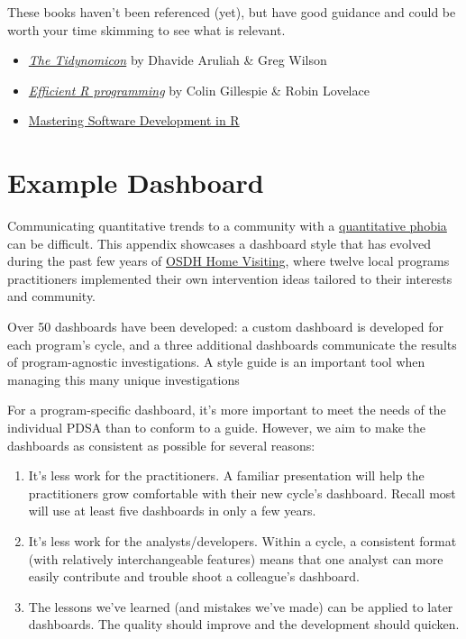 \documentclass[
]{book}
\providecommand{\tightlist}{%
  \setlength{\itemsep}{0pt}\setlength{\parskip}{0pt}}
\begin{document}
These books haven't been referenced (yet), but have good guidance and could be worth your time skimming to see what is relevant.

\begin{itemize}
\item
  \href{http://tidynomicon.tech/}{\emph{The Tidynomicon}} by Dhavide Aruliah \& Greg Wilson
\item
  \href{https://bookdown.org/csgillespie/efficientR/}{\emph{Efficient R programming}} by Colin Gillespie \& Robin Lovelace
\item
  \href{https://bookdown.org/rdpeng/RProgDA/}{Mastering Software Development in R}
\end{itemize}

\hypertarget{example-dashboard}{%
\chapter{Example Dashboard}\label{example-dashboard}}

Communicating quantitative trends to a community with a \protect\hyperlink{publication-phobic}{quantitative phobia} can be difficult. This appendix showcases a dashboard style that has evolved during the past few years of \href{https://www.ok.gov/health/Family_Health/Family_Support_and_Prevention_Service/MIECHV_Program_-_Federal_Home_Visiting_Grant/About_the_MIECHV_Program_-_Federal_Home_Visiting_Grant/index.html}{OSDH Home Visiting}, where twelve local programs practitioners implemented their own intervention ideas tailored to their interests and community.

Over 50 dashboards have been developed: a custom dashboard is developed for each program's cycle, and a three additional dashboards communicate the results of program-agnostic investigations. A style guide is an important tool when managing this many unique investigations

For a program-specific dashboard, it's more important to meet the needs of the individual PDSA than to conform to a guide. However, we aim to make the dashboards as consistent as possible for several reasons:

\begin{enumerate}
\def\labelenumi{\arabic{enumi}.}
\tightlist
\item
  It's less work for the practitioners. A familiar presentation will help the practitioners grow comfortable with their new cycle's dashboard. Recall most will use at least five dashboards in only a few years.
\item
  It's less work for the analysts/developers. Within a cycle, a consistent format (with relatively interchangeable features) means that one analyst can more easily contribute and trouble shoot a colleague's dashboard.
\item
  The lessons we've learned (and mistakes we've made) can be applied to later dashboards. The quality should improve and the development should quicken.
\end{enumerate}
\end{document}
